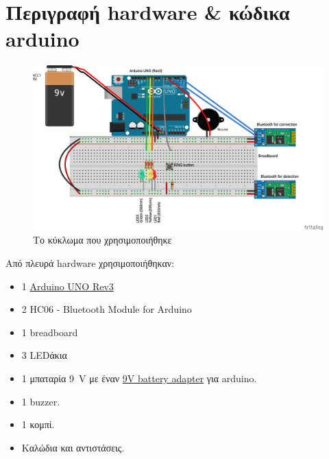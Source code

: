 \section{Περιγραφή hardware \& κώδικα arduino}
\renewcommand{\figurename}{Σχήμα}
\begin{figure}[htb]
    \centering
    \includegraphics[keepaspectratio, width=\linewidth]{hardware/sketch_bb}
    \caption{Το κύκλωμα που χρησιμοποιήθηκε}
    \label{fig:hardware}
\end{figure}
Από πλευρά hardware χρησιμοποιήθηκαν:
\begin{itemize}
\item 1 \href{https://www.arduino.cc/en/Main/ArduinoBoardUno}{Arduino UNO Rev3}
\item 2 HC06 - Bluetooth Module for Arduino
\item 1 breadboard
\item 3 LEDάκια
\item 1 μπαταρία \SI{9}{\volt} με έναν \href{http://playground.arduino.cc/Learning/9VBatteryAdapter}{9V battery adapter} για arduino.
\item 1 buzzer.
\item 1 κομπί.
\item Καλώδια και αντιστάσεις.
\end{itemize}

